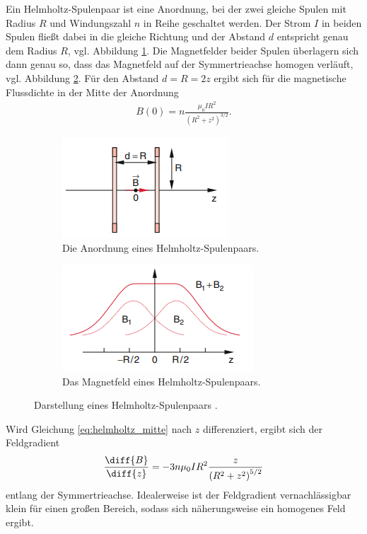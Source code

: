 \noindent
Ein Helmholtz-Spulenpaar ist eine Anordnung, bei der zwei gleiche Spulen mit Radius $R$ und Windungszahl $n$ in Reihe geschaltet werden.
Der Strom $I$ in beiden Spulen fließt dabei in die gleiche Richtung und der Abstand $d$ entspricht genau dem Radius $R$, vgl. Abbildung \ref{fig:Anordnung_Helmholtz}.
Die Magnetfelder beider Spulen überlagern sich dann genau so, dass das Magnetfeld auf der Symmertrieachse homogen verläuft, vgl. Abbildung \ref{fig:Magnetfeld_Helmholtz}.
Für den Abstand $d = R = 2z$ ergibt sich für die magnetische Flussdichte in der Mitte der Anordnung
\begin{align}
    \label{eq:helmholtz_mitte}
    B(0) = n \frac{\mu_0 I R^2}{\left(R^2 + z^2\right)^{3/2}}.
\end{align}
%
\begin{figure}[H]%
    \begin{subfigure}{0.48\textwidth}%
    \centering%
    \includegraphics[]{./abbildungen/Anordnung Helmholtz.png}%
    \caption{Die Anordnung eines Helmholtz-Spulenpaars.}%
    \label{fig:Anordnung_Helmholtz}%
    \end{subfigure}%
    \hfill%
    \begin{subfigure}{0.48\textwidth}%
    \centering%
    \includegraphics[]{./abbildungen/Magnetfeld Helmholtz.png}%
    \caption{Das Magnetfeld eines Helmholtz-Spulenpaars.}%
    \label{fig:Magnetfeld_Helmholtz}%
    \end{subfigure}%
    \caption{Darstellung eines Helmholtz-Spulenpaars  \cite[S.92]{demtroeder2}.}%
    \label{fig:logos}%
\end{figure}%
%
Wird Gleichung \eqref{eq:helmholtz_mitte} nach $z$ differenziert, ergibt sich der Feldgradient
\begin{align}
    \label{eq:feldgradient}
    \frac{\diff{B}}{\diff{z}} = -3 n \mu_0 I R^2 \frac{z}{\left(R^2 + z^2\right)^{5/2}}
\end{align}
entlang der Symmertrieachse.
Idealerweise ist der Feldgradient vernachlässigbar klein für einen großen Bereich, 
sodass sich näherungsweise ein homogenes Feld ergibt.

